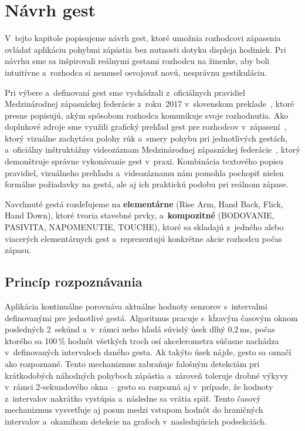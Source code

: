 \section{Návrh gest}
\label{chapter:gesta}

V~tejto kapitole popisujeme návrh gest, ktoré
umožnia rozhodcovi zápasenia ovládať aplikáciu
pohybmi zápästia bez nutnosti dotyku displeja
hodiniek. Pri návrhu sme sa inšpirovali reálnymi
gestami rozhodcu na žinenke, aby boli intuitívne
a~rozhodca si nemusel osvojovať novú, nesprávnu
gestikuláciu.

Pri výbere a~definovaní gest sme vychádzali z~oficiálnych
pravidiel Medzinárodnej zápasníckej federácie z~roku~2017
v~slovenskom preklade~\cite{zapasenie_pravidla}, ktoré
presne popisujú, akým spôsobom rozhodca komunikuje svoje
rozhodnutia. Ako doplnkové zdroje sme využili grafický
prehľad gest pre rozhodcov v~zápasení~\cite{wrestling-referee-signals},
ktorý vizuálne zachytáva polohy rúk a~smery pohybu pri
jednotlivých gestách, a~oficiálny inštruktážny videozáznam
Medzinárodnej zápasníckej federácie~\cite{uww-referee-mechanics-video},
ktorý demonštruje správne vykonávanie gest v~praxi.
Kombinácia textového popisu pravidiel, vizuálneho prehľadu
a~videozáznamu nám pomohla pochopiť nielen formálne
požiadavky na gestá, ale aj ich praktickú podobu pri
reálnom zápase.

Navrhnuté gestá rozdeľujeme na \textbf{elementárne}
(Rise Arm, Hand Back, Flick, Hand Down), ktoré
tvoria stavebné prvky, a~\textbf{kompozitné}
(BODOVANIE, PASIVITA, NAPOMENUTIE, TOUCHE), ktoré
sa skladajú z~jedného alebo viacerých elementárnych
gest a~reprezentujú konkrétne akcie rozhodcu počas
zápasu.

\subsection{Princíp rozpoznávania}
\label{subsec:princip-rozpoznavania}

Aplikácia kontinuálne porovnáva aktuálne hodnoty
senzorov s~intervalmi definovanými pre
jednotlivé gestá. Algoritmus pracuje s~kĺzavým časovým
oknom posledných 2~sekúnd a~v~rámci neho hľadá súvislý
úsek dlhý 0{,}2\,ms, počas ktorého sa 100\,\% hodnôt
všetkých troch osí akcelerometra súčasne nachádza
v~definovaných intervaloch daného gesta. Ak takýto
úsek nájde, gesto sa označí ako rozpoznané. Tento
mechanizmus zabraňuje falošným detekciám pri
krátkodobých náhodných pohyboch zápästia a~zároveň
toleruje drobné výkyvy v~rámci 2-sekundového okna --
gesto sa rozpozná aj v~prípade, že hodnoty z~intervalov
nakrátko vystúpia a~následne sa vrátia späť. Tento
časový mechanizmus vysvetľuje aj posun medzi
vstupom hodnôt do hraničných intervalov a~okamihom
detekcie na grafoch v~nasledujúcich podsekciách.

